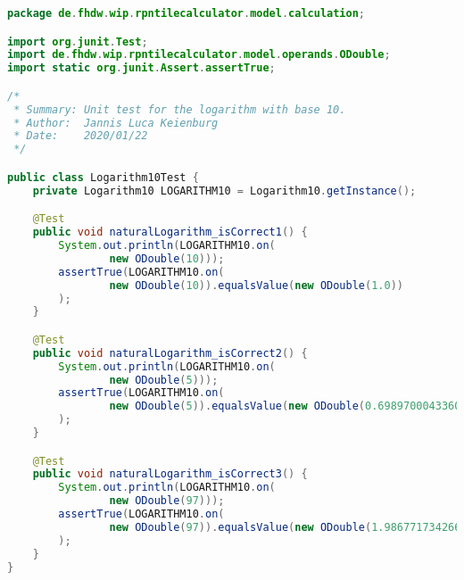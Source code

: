 \begin{lstlisting}[caption=Logarithm10Test (Keienburg),label=list:Logarithm10Test,language=Java]
package de.fhdw.wip.rpntilecalculator.model.calculation;

import org.junit.Test;
import de.fhdw.wip.rpntilecalculator.model.operands.ODouble;
import static org.junit.Assert.assertTrue;

/*
 * Summary: Unit test for the logarithm with base 10. 
 * Author:  Jannis Luca Keienburg
 * Date:    2020/01/22
 */

public class Logarithm10Test {
    private Logarithm10 LOGARITHM10 = Logarithm10.getInstance();

    @Test
    public void naturalLogarithm_isCorrect1() {
        System.out.println(LOGARITHM10.on(
                new ODouble(10)));
        assertTrue(LOGARITHM10.on(
                new ODouble(10)).equalsValue(new ODouble(1.0))
        );
    }

    @Test
    public void naturalLogarithm_isCorrect2() {
        System.out.println(LOGARITHM10.on(
                new ODouble(5)));
        assertTrue(LOGARITHM10.on(
                new ODouble(5)).equalsValue(new ODouble(0.6989700043360189))
        );
    }

    @Test
    public void naturalLogarithm_isCorrect3() {
        System.out.println(LOGARITHM10.on(
                new ODouble(97)));
        assertTrue(LOGARITHM10.on(
                new ODouble(97)).equalsValue(new ODouble(1.9867717342662448))
        );
    }
}
\end{lstlisting} 

